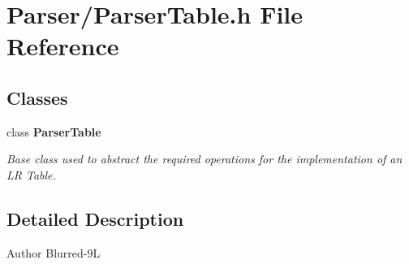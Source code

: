 \section{Parser/\-Parser\-Table.h File Reference}
\label{_parser_table_8h}
\subsection*{Classes}
\begin{DoxyCompactItemize}
\item 
class {\bf Parser\-Table}
\begin{DoxyCompactList}\small\item\em Base class used to abstract the required operations for the implementation of an L\-R Table. \end{DoxyCompactList}\end{DoxyCompactItemize}


\subsection{Detailed Description}
\begin{DoxyAuthor}{Author}
Blurred-\/9\-L 
\end{DoxyAuthor}
